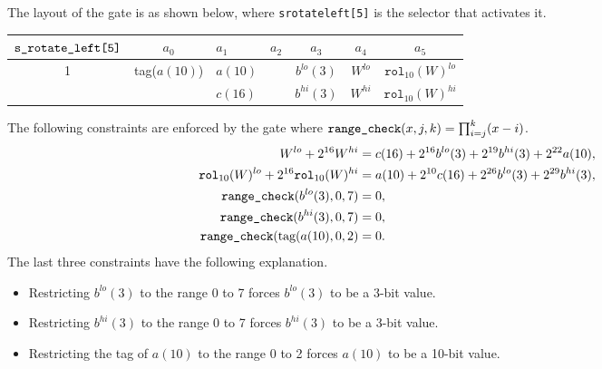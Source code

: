 \documentclass[10pt]{article}
\begin{document}
The layout of the gate is as shown below, where \texttt{s\textunderscore rotate\textunderscore left[5]} is the selector that activates it.

\begin{center}
  \begin{tabular}{c|c|l|l|c|c|c}
    $\texttt{s\textunderscore rotate\textunderscore left[5]}$ & $a_0$ & $a_1$ & $a_2$ & $a_3$ & $a_4$ & $a_5$ \\ \hline
    1  & tag($a(10)$) & $a(10)$ &                        & $b^{lo}(3)$ & $W^{lo}$  & $\texttt{rol}_{10}(W)^{lo}$  \\ 
       &              & $c(16)$ &                        & $b^{hi}(3)$ & $W^{hi}$  & $\texttt{rol}_{10}(W)^{hi}$  \\ \hline
  \end{tabular}
\end{center}

The following constraints are enforced by the gate where $\texttt{range\textunderscore check}(x, j, k) = \prod_{i=j}^k (x-i)$.
\begin{align*}
  W^{lo} + 2^{16} W^{hi} & = c(16) + 2^{16} b^{lo}(3) + 2^{19} b^{hi}(3) + 2^{22} a(10),\\
  \texttt{rol}_{10}(W)^{lo} + 2^{16} \texttt{rol}_{10}(W)^{hi} & = a(10) + 2^{10} c(16) + 2^{26} b^{lo}(3) + 2^{29} b^{hi}(3),\\
  \texttt{range\textunderscore check}(b^{lo}(3), 0, 7) & = 0,\\
  \texttt{range\textunderscore check}(b^{hi}(3), 0, 7) & = 0,\\
  \texttt{range\textunderscore check}(\text{tag}(a(10), 0, 2) & = 0.
\end{align*}
The last three constraints have the following explanation.
\begin{itemize}
\item Restricting $b^{lo}(3)$ to the range 0 to 7 forces $b^{lo}(3)$ to be a 3-bit value.
\item Restricting $b^{hi}(3)$ to the range 0 to 7 forces $b^{hi}(3)$ to be a 3-bit value.
\item Restricting the tag of $a(10)$ to the range 0 to 2 forces $a(10)$ to be a 10-bit value.
\end{itemize}
\end{document}
